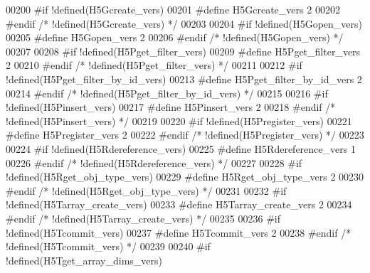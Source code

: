 \begin{DoxyCode}
00200 \textcolor{preprocessor}{#if !defined(H5Gcreate\_vers)}
00201 \textcolor{preprocessor}{  #define H5Gcreate\_vers 2}
00202 \textcolor{preprocessor}{#endif }\textcolor{comment}{/* !defined(H5Gcreate\_vers) */}\textcolor{preprocessor}{}
00203 
00204 \textcolor{preprocessor}{#if !defined(H5Gopen\_vers)}
00205 \textcolor{preprocessor}{  #define H5Gopen\_vers 2}
00206 \textcolor{preprocessor}{#endif }\textcolor{comment}{/* !defined(H5Gopen\_vers) */}\textcolor{preprocessor}{}
00207 
00208 \textcolor{preprocessor}{#if !defined(H5Pget\_filter\_vers)}
00209 \textcolor{preprocessor}{  #define H5Pget\_filter\_vers 2}
00210 \textcolor{preprocessor}{#endif }\textcolor{comment}{/* !defined(H5Pget\_filter\_vers) */}\textcolor{preprocessor}{}
00211 
00212 \textcolor{preprocessor}{#if !defined(H5Pget\_filter\_by\_id\_vers)}
00213 \textcolor{preprocessor}{  #define H5Pget\_filter\_by\_id\_vers 2}
00214 \textcolor{preprocessor}{#endif }\textcolor{comment}{/* !defined(H5Pget\_filter\_by\_id\_vers) */}\textcolor{preprocessor}{}
00215 
00216 \textcolor{preprocessor}{#if !defined(H5Pinsert\_vers)}
00217 \textcolor{preprocessor}{  #define H5Pinsert\_vers 2}
00218 \textcolor{preprocessor}{#endif }\textcolor{comment}{/* !defined(H5Pinsert\_vers) */}\textcolor{preprocessor}{}
00219 
00220 \textcolor{preprocessor}{#if !defined(H5Pregister\_vers)}
00221 \textcolor{preprocessor}{  #define H5Pregister\_vers 2}
00222 \textcolor{preprocessor}{#endif }\textcolor{comment}{/* !defined(H5Pregister\_vers) */}\textcolor{preprocessor}{}
00223 
00224 \textcolor{preprocessor}{#if !defined(H5Rdereference\_vers)}
00225 \textcolor{preprocessor}{  #define H5Rdereference\_vers 1}
00226 \textcolor{preprocessor}{#endif }\textcolor{comment}{/* !defined(H5Rdereference\_vers) */}\textcolor{preprocessor}{}
00227 
00228 \textcolor{preprocessor}{#if !defined(H5Rget\_obj\_type\_vers)}
00229 \textcolor{preprocessor}{  #define H5Rget\_obj\_type\_vers 2}
00230 \textcolor{preprocessor}{#endif }\textcolor{comment}{/* !defined(H5Rget\_obj\_type\_vers) */}\textcolor{preprocessor}{}
00231 
00232 \textcolor{preprocessor}{#if !defined(H5Tarray\_create\_vers)}
00233 \textcolor{preprocessor}{  #define H5Tarray\_create\_vers 2}
00234 \textcolor{preprocessor}{#endif }\textcolor{comment}{/* !defined(H5Tarray\_create\_vers) */}\textcolor{preprocessor}{}
00235 
00236 \textcolor{preprocessor}{#if !defined(H5Tcommit\_vers)}
00237 \textcolor{preprocessor}{  #define H5Tcommit\_vers 2}
00238 \textcolor{preprocessor}{#endif }\textcolor{comment}{/* !defined(H5Tcommit\_vers) */}\textcolor{preprocessor}{}
00239 
00240 \textcolor{preprocessor}{#if !defined(H5Tget\_array\_dims\_vers)}

\end{DoxyCode}

